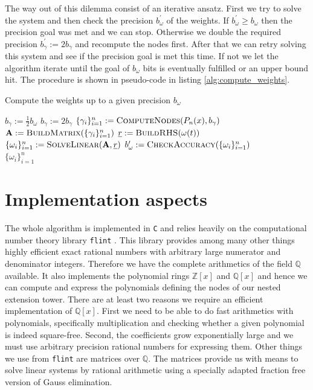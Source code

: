 \documentclass[a4paper,10pt]{article}
\begin{document}
The way out of this dilemma consist of an iterative ansatz. First we try to
solve the system and then check the precision $b_{\omega}^{\prime}$ of the
weights. If $b_{\omega}^{\prime} \geq b_{\omega}$ then the precision goal was
met and we can stop. Otherwise we double the required precision
$b_{\gamma}^{\prime} := 2 b_{\gamma}$ and recompute the nodes first. After
that we can retry solving this system and see if the precision goal is met
this time. If not we let the algorithm iterate until the goal of $b_{\omega}$ bits
is eventually fulfilled or an upper bound hit. The procedure is shown in pseudo-code
in listing \ref{alg:compute_weights}.

\begin{algorithm}
  \caption{Compute the weights up to a given precision $b_{\omega}$}
  \label{alg:compute_weights}
  \begin{algorithmic}
      \State $b_{\gamma} := \frac{1}{2} b_{\omega}$
      \Repeat
        \State $b_{\gamma} := 2 b_{\gamma}$
        \State $\{\gamma_i\}_{i=1}^{n} := \textsc{ComputeNodes}(P_n(x), b_{\gamma})$
        \State $\mat{A} := \textsc{BuildMatrix}(\{\gamma_i\}_{i=1}^{n})$
        \State $\vec{r} := \textsc{BuildRHS}(\omega(t))$
        \State $\{\omega_i\}_{i=1}^{n} := \textsc{SolveLinear}(\mat{A}, \vec{r})$
        \State $b^{\prime}_{\omega} := \textsc{CheckAccuracy}(\{\omega_i\}_{i=1}^{n})$
       \\
      \Return $\{\omega_i\}_{i=1}^{n}$
    \EndProcedure
  \end{algorithmic}
\end{algorithm}


\FloatBarrier
\section{Implementation aspects}
\label{sec:implementation_aspects}

The whole algorithm is implemented in \texttt{C} and relies heavily
on the computational number theory library \texttt{flint} \cite{flint, Hart2010}.
This library provides among many other things highly efficient exact rational
numbers with arbitrary large numerator and denominator integers. Therefore we
have the complete arithmetics of the field $\mathbb{Q}$ available. It also
implements the polynomial rings $\mathbb{Z}[x]$ and $\mathbb{Q}[x]$ and hence we
can compute and express the polynomials defining the nodes of our nested extension
tower. There are at least two reasons we require an efficient implementation of
$\mathbb{Q}[x]$. First we need to be able to do fast arithmetics with polynomials,
specifically multiplication and checking whether a given polynomial is indeed square-free.
Second, the coefficients grow exponentially large and we must use arbitrary precision
rational numbers for expressing them. Other things we use from \texttt{flint} are
matrices over $\mathbb{Q}$. The matrices provide us with means to solve linear systems
by rational arithmetic using a specially adapted fraction free version of Gauss elimination.
\end{document}
